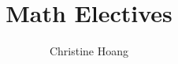\documentclass{article}
\title{Math Electives}
\author{Christine Hoang}
\begin{document}
\maketitle

\section{}
\end{document}
